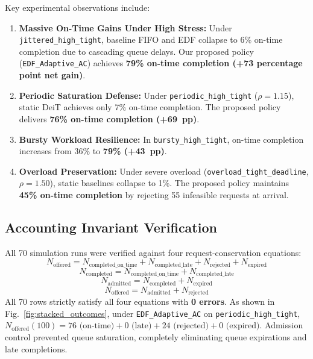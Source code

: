\documentclass[conference]{IEEEtran}
\begin{document}
Key experimental observations include:
\begin{enumerate}
    \item \textbf{Massive On-Time Gains Under High Stress:} Under \texttt{jittered\_high\_tight}, baseline FIFO and EDF collapse to 6\% on-time completion due to cascading queue delays. Our proposed policy (\texttt{EDF\_Adaptive\_AC}) achieves \textbf{79\% on-time completion (+73 percentage point net gain)}.
    \item \textbf{Periodic Saturation Defense:} Under \texttt{periodic\_high\_tight} ($\rho=1.15$), static DeiT achieves only 7\% on-time completion. The proposed policy delivers \textbf{76\% on-time completion (+69~pp)}.
    \item \textbf{Bursty Workload Resilience:} In \texttt{bursty\_high\_tight}, on-time completion increases from 36\% to \textbf{79\% (+43~pp)}.
    \item \textbf{Overload Preservation:} Under severe overload (\texttt{overload\_tight\_deadline}, $\rho=1.50$), static baselines collapse to 1\%. The proposed policy maintains \textbf{45\% on-time completion} by rejecting 55 infeasible requests at arrival.
\end{enumerate}

\subsection{Accounting Invariant Verification}
All 70 simulation runs were verified against four request-conservation equations:
\begin{equation}
N_{\text{offered}} = N_{\text{completed\_on\_time}} + N_{\text{completed\_late}} + N_{\text{rejected}} + N_{\text{expired}}
\end{equation}
\begin{equation}
N_{\text{completed}} = N_{\text{completed\_on\_time}} + N_{\text{completed\_late}}
\end{equation}
\begin{equation}
N_{\text{admitted}} = N_{\text{completed}} + N_{\text{expired}}
\end{equation}
\begin{equation}
N_{\text{offered}} = N_{\text{admitted}} + N_{\text{rejected}}
\end{equation}
All 70 rows strictly satisfy all four equations with \textbf{0 errors}. As shown in Fig.~\ref{fig:stacked_outcomes}, under \texttt{EDF\_Adaptive\_AC} on \texttt{periodic\_high\_tight}, $N_{\text{offered}} (100) = 76 \text{ (on-time)} + 0 \text{ (late)} + 24 \text{ (rejected)} + 0 \text{ (expired)}$. Admission control prevented queue saturation, completely eliminating queue expirations and late completions.
\end{document}
